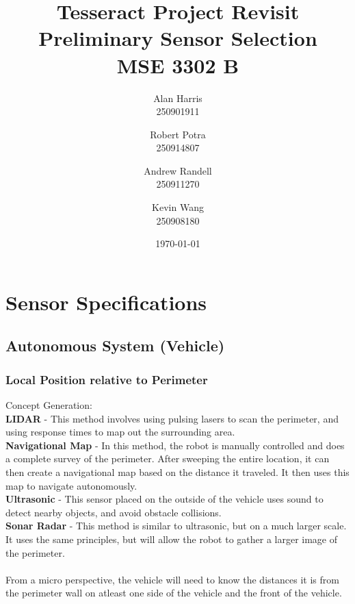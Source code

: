 \documentclass[12pt]{article}
\begin{document}
\title{\textbf{Tesseract Project Revisit\\Preliminary Sensor Selection\\ MSE 3302 B}}
\author{
  Alan Harris\\
  250901911
  \and
  Robert Potra\\
  250914807
  \and
  Andrew Randell\\
  250911270
  \and
  Kevin Wang\\
  250908180
}
\date{\today}
\maketitle

\tableofcontents
\thispagestyle{empty}

\pagebreak
\setcounter{page}{1}

\section{Sensor Specifications}
\subsection{Autonomous System (Vehicle)}
\subsubsection{Local Position relative to Perimeter}
Concept Generation:\\
\textbf{LIDAR} - This method involves using pulsing lasers to scan the perimeter, and using response times to map out the surrounding area.\\
\textbf{Navigational Map} - In this method, the robot is manually controlled and does a complete survey of the perimeter. After sweeping the entire location, it can then create a navigational map based on the distance it traveled. It then uses this map to navigate autonomously.\\
\textbf{Ultrasonic} - This sensor placed on the outside of the vehicle uses sound to detect nearby objects, and avoid obstacle collisions.\\
\textbf{Sonar Radar} - This method is similar to ultrasonic, but on a much larger scale. It uses the same principles, but will allow the robot to gather a larger image of the perimeter.\\\\
From a micro perspective, the vehicle will need to know the distances it is from the perimeter wall on atleast one side of the vehicle and the front of the vehicle.
\end{document}

